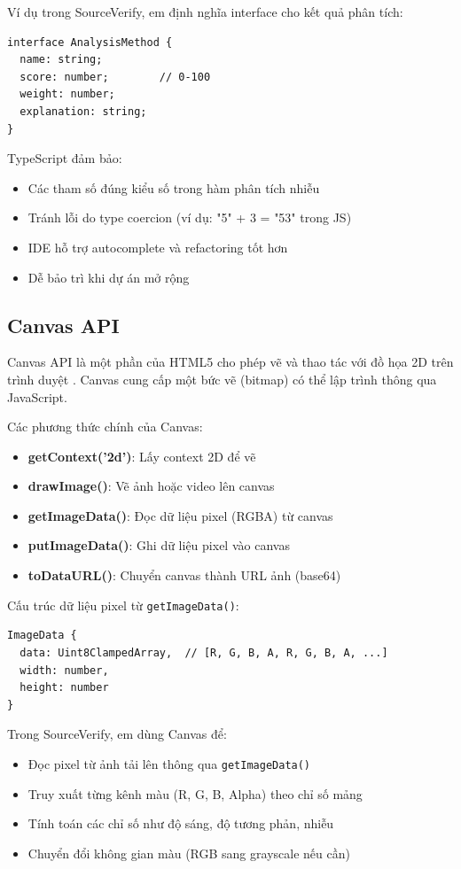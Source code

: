 \documentclass[14pt,a4paper,oneside]{report}
\begin{document}
Ví dụ trong SourceVerify, em định nghĩa interface cho kết quả phân tích:
\begin{verbatim}
interface AnalysisMethod {
  name: string;
  score: number;        // 0-100
  weight: number;
  explanation: string;
}
\end{verbatim}

TypeScript đảm bảo:
\begin{itemize}
  \item Các tham số đúng kiểu số trong hàm phân tích nhiễu
  \item Tránh lỗi do type coercion (ví dụ: "5" + 3 = "53" trong JS)
  \item IDE hỗ trợ autocomplete và refactoring tốt hơn
  \item Dễ bảo trì khi dự án mở rộng
\end{itemize}

\subsection{Canvas API}
Canvas API là một phần của HTML5 cho phép vẽ và thao tác với đồ họa 2D trên trình duyệt \cite{canvas}. Canvas cung cấp một bức vẽ (bitmap) có thể lập trình thông qua JavaScript.

Các phương thức chính của Canvas:
\begin{itemize}
  \item \textbf{getContext('2d')}: Lấy context 2D để vẽ
  \item \textbf{drawImage()}: Vẽ ảnh hoặc video lên canvas
  \item \textbf{getImageData()}: Đọc dữ liệu pixel (RGBA) từ canvas
  \item \textbf{putImageData()}: Ghi dữ liệu pixel vào canvas
  \item \textbf{toDataURL()}: Chuyển canvas thành URL ảnh (base64)
\end{itemize}

Cấu trúc dữ liệu pixel từ \texttt{getImageData()}:
\begin{verbatim}
ImageData {
  data: Uint8ClampedArray,  // [R, G, B, A, R, G, B, A, ...]
  width: number,
  height: number
}
\end{verbatim}

Trong SourceVerify, em dùng Canvas để:
\begin{itemize}
  \item Đọc pixel từ ảnh tải lên thông qua \texttt{getImageData()}
  \item Truy xuất từng kênh màu (R, G, B, Alpha) theo chỉ số mảng
  \item Tính toán các chỉ số như độ sáng, độ tương phản, nhiễu
  \item Chuyển đổi không gian màu (RGB sang grayscale nếu cần)
\end{itemize}
\end{document}

